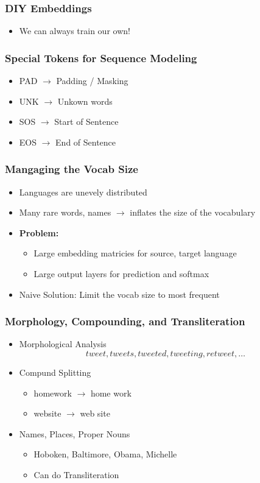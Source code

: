 \documentclass{beamer}
\begin{document}
\begin{frame}
\frametitle{DIY Embeddings}
\begin{itemize}
  \item We can always train our own!
\end{itemize}
\end{frame}

\begin{frame}
\frametitle{Special Tokens for Sequence Modeling}
\begin{itemize}
  \item PAD $\rightarrow$ Padding / Masking
  \item UNK $\rightarrow$ Unkown words
  \item SOS $\rightarrow$ Start of Sentence
  \item EOS $\rightarrow$ End of Sentence
\end{itemize}
\end{frame}

\begin{frame}
\frametitle{Mangaging the Vocab Size}
\begin{itemize}
  \item Languages are unevely distributed
  \item Many rare words, names $\rightarrow$ inflates the size of the vocabulary
  \item \textbf{Problem:}
  \begin{itemize}
    \item Large embedding matricies for source, target language
    \item Large output layers for prediction and softmax
  \end{itemize}
  \item Naive Solution: Limit the vocab size to most frequent
\end{itemize}
\end{frame}

\begin{frame}
\frametitle{Morphology, Compounding, and Transliteration}
\begin{itemize}
  \item Morphological Analysis
  \begin{equation*}
    tweet, tweets, tweeted, tweeting, retweet, \hdots
  \end{equation*}
  \item Compund Splitting
  \begin{itemize}
    \item homework $\rightarrow$ home work
    \item website $\rightarrow$ web site
  \end{itemize}
  \item Names, Places, Proper Nouns
  \begin{itemize}
    \item Hoboken, Baltimore, Obama, Michelle
    \item Can do Transliteration
  \end{itemize}
\end{itemize}
\end{frame}
\end{document}

